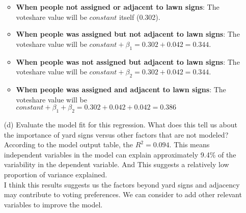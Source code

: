 \documentclass[12pt,letterpaper]{article}
\begin{document}
\begin{enumerate}
	\begin{itemize}
	\item \textbf{When people not assigned or adjacent to lawn signs}: The voteshare value will be $constant$ itself (0.302).
	\item \textbf{When people was assigned but not adjacent to lawn signs}: The voteshare value will be $constant + \beta_1 = 0.302 + 0.042 = 0.344$.
	\item \textbf{When people was not assigned but adjacent to lawn signs}: The voteshare value will be $constant + \beta_2 = 0.302 + 0.042 = 0.344$.
	\item \textbf{When people was assigned and adjacent to lawn signs}: The voteshare value will be $constant + \beta_1 + \beta_2 = 0.302 + 0.042 + 0.042 = 0.386$
	\end{itemize}
	
	\vspace{.5cm}
	
	\item [(d)] Evaluate the model fit for this regression.  What does this	tell us about the importance of yard signs versus other factors that are not modeled? \\
	
	According to the model output table, the $R^2 = 0.094$. This means independent variables in the model can explain approximately 9.4\% of the variability in the dependent variable. And This suggests a relatively low proportion of variance explained.\\
	
	I think this results suggests us the factors beyond yard signs and adjacency may contribute to voting preferences. We can consider to add other relevant variables to  improve the model.\\
	
\end{enumerate}  
\end{document}
